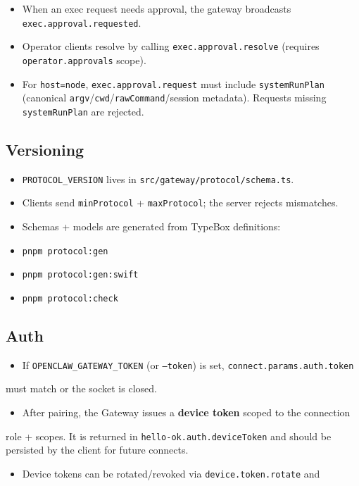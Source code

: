 \begin{itemize}
  \item When an exec request needs approval, the gateway broadcasts \texttt{exec.approval.requested}.
  \item Operator clients resolve by calling \texttt{exec.approval.resolve} (requires \texttt{operator.approvals} scope).
  \item For \texttt{host=node}, \texttt{exec.approval.request} must include \texttt{systemRunPlan} (canonical \texttt{argv}/\texttt{cwd}/\texttt{rawCommand}/session metadata). Requests missing \texttt{systemRunPlan} are rejected.
\end{itemize}


\subsection{Versioning}


\begin{itemize}
  \item \texttt{PROTOCOL\_VERSION} lives in \texttt{src/gateway/protocol/schema.ts}.
  \item Clients send \texttt{minProtocol} + \texttt{maxProtocol}; the server rejects mismatches.
  \item Schemas + models are generated from TypeBox definitions:
  \item \texttt{pnpm protocol:gen}
  \item \texttt{pnpm protocol:gen:swift}
  \item \texttt{pnpm protocol:check}
\end{itemize}


\subsection{Auth}


\begin{itemize}
  \item If \texttt{OPENCLAW\_GATEWAY\_TOKEN} (or \texttt{--token}) is set, \texttt{connect.params.auth.token}
\end{itemize}

must match or the socket is closed.
\begin{itemize}
  \item After pairing, the Gateway issues a \textbf{device token} scoped to the connection
\end{itemize}

role + scopes. It is returned in \texttt{hello-ok.auth.deviceToken} and should be
persisted by the client for future connects.
\begin{itemize}
  \item Device tokens can be rotated/revoked via \texttt{device.token.rotate} and
\end{itemize}

